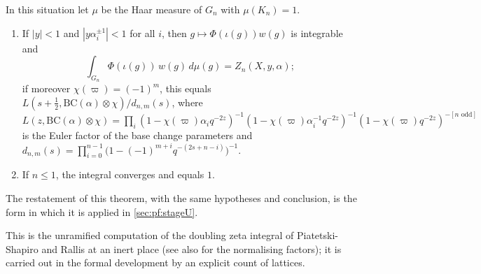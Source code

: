 \begin{theorem}\label{pf:sh-theta:inert}
In this situation let $\mu$ be the Haar measure of $G_n$ with $\mu(K_n)=1$.
\begin{enumerate}[label=(\alph*)]
\item If $|y|<1$ and $|y\alpha_i^{\pm1}|<1$ for all $i$, then $g\mapsto\Phi(\iota(g))w(g)$ is integrable and
\[
\int_{G_n}\Phi(\iota(g))\,w(g)\,d\mu(g)=Z_n(X,y,\alpha);
\]
if moreover $\chi(\varpi)=(-1)^m$, this equals $L(s+\frac12,\mathrm{BC}(\alpha)\otimes\chi)/d_{n,m}(s)$, where
$L(z,\mathrm{BC}(\alpha)\otimes\chi)=\prod_i(1-\chi(\varpi)\alpha_iq^{-2z})^{-1}(1-\chi(\varpi)\alpha_i^{-1}q^{-2z})^{-1}
(1-\chi(\varpi)q^{-2z})^{-[n\text{ odd}]}$ is the Euler factor of the base change parameters and
$d_{n,m}(s)=\prod_{i=0}^{n-1}\bigl(1-(-1)^{m+i}q^{-(2s+n-i)}\bigr)^{-1}$.
\item If $n\le1$, the integral converges and equals $1$.
\end{enumerate}
\end{theorem}

The restatement  of this theorem, with the same hypotheses and
conclusion, is the form in which it is applied in \cref{sec:pf:stageU}.

This is the unramified computation of the doubling zeta integral of Piatetski-Shapiro and Rallis
\cite{PiatetskiShapiroRallis1987,GelbartPiatetskiShapiroRallis1987} at an inert place (see also \cite{LapidRallis2005} for the
normalising factors); it is carried out in the formal development by an explicit count of lattices.

